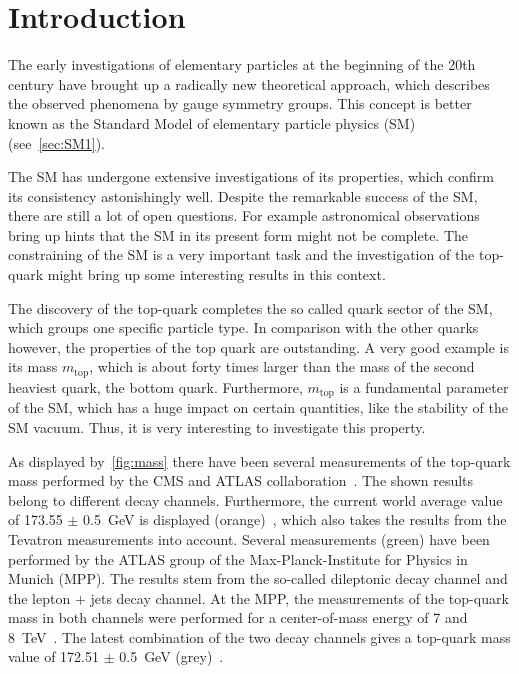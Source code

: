 \chapter{Introduction}

\label{sec:intro}

The early investigations of elementary particles at the beginning of the 20th century have brought up a radically new theoretical approach, which describes the observed phenomena by gauge symmetry groups. This concept is better known as the Standard Model of elementary particle physics (SM) (see~\cref{sec:SM1}).

The SM has undergone extensive investigations of its properties, which confirm its consistency astonishingly well. Despite the remarkable success of the SM, there are still a lot of open questions. For example astronomical observations  bring up hints that the SM in its present form might not be complete. The constraining of the SM  is a very important task and the investigation of the top-quark might bring up some interesting results in this context. 

The discovery of the top-quark completes the so called quark sector of the SM, which groups one specific particle type. In comparison with the other quarks however, the properties of the top quark are outstanding. A very good example  is its mass $m_{\text{top}}$, which is about forty times larger than the mass of the second heaviest quark, the bottom quark. Furthermore, $m_{\text{top}}$ is a fundamental parameter of the SM, which has a huge impact on certain quantities, like the stability of the SM vacuum.  Thus, it is very interesting to investigate this property.

As displayed by~\cref{fig:mass} there have been several measurements of the top-quark mass performed by the CMS and ATLAS collaboration~\cite{PubR}. The shown results belong to different decay channels. Furthermore, the current world average value of 173.55 $\pm$ 0.5~GeV is displayed (orange)~\cite{ATLAS:2014wva}, which also takes the results from the Tevatron measurements into account. Several measurements (green) have been performed by the ATLAS group of the Max-Planck-Institute for Physics in Munich (MPP). The results stem from the so-called dileptonic decay channel and the lepton + jets decay channel. At the MPP, the measurements of the top-quark mass in both channels were performed for a center-of-mass energy of 7 and 8~TeV~\cite{Aad:2015nba,Aaboud:2016igd,ATLAS-CONF-2017-071}. 
The latest combination of the two decay channels gives a top-quark mass value of 172.51 $\pm$ 0.5~GeV (grey)~\cite{ATLAS-CONF-2017-071}.






